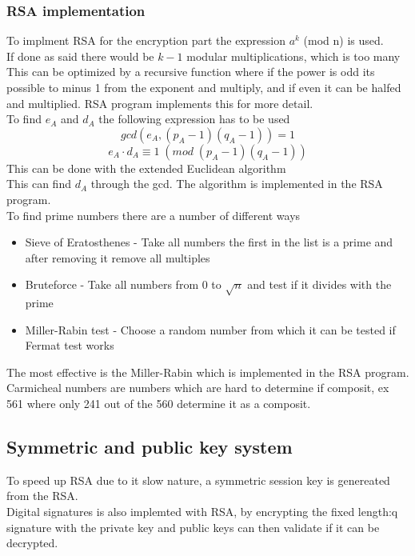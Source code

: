 \documentclass[12pt, a4paper]{article}
\begin{document}
				\subsubsection{RSA implementation}
					To implment RSA for the encryption part the expression $a^k$ (mod n) is used.\\
					If done as said there would be $k-1$ modular multiplications, which is too many\\
					This can be optimized by a recursive function where if the power is odd its possible to minus 1 from the exponent  and multiply, and if even it can be halfed and multiplied. RSA program implements this for more detail.\\[4mm]
					To find $e_A$ and $d_A$ the following expression has to be used\\
					$$gcd(e_A,(p_A-1)(q_A-1))=1$$
					$$e_A\cdot d_A\equiv 1\;(mod\;(p_A-1)(q_A-1))$$
					This can be done with the extended Euclidean algorithm\\
					This can find $d_A$ through the gcd. The algorithm is implemented in the RSA program.\\[4mm]
					To find prime numbers there are a number of different ways\\
					\begin{itemize}
						\item Sieve of Eratosthenes - Take all numbers the first in the list is a prime and after removing it remove all multiples
						\item Bruteforce - Take all numbers from 0 to $\sqrt{n}$ and test if it divides with the prime
						\item Miller-Rabin test - Choose a random number from which it can be tested if Fermat test works
					\end{itemize}
					The most effective is the Miller-Rabin which is implemented in the RSA program.\\
					Carmicheal numbers are numbers which are hard to determine if composit, ex 561 where only 241 out of the 560 determine it as a composit.\\
				\subsection{Symmetric and public key system}
					To speed up RSA due to it slow nature, a symmetric session key is genereated from the RSA.\\
					Digital signatures is also implemted with RSA, by encrypting the fixed length:q
					signature with the private key and public keys can then validate if it can be decrypted.
\end{document}
